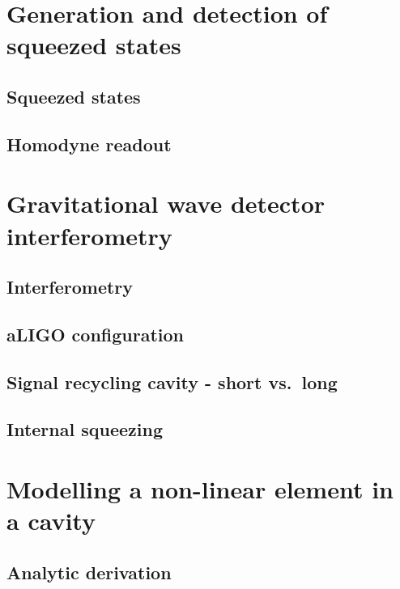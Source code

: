 \documentclass[aps,pra,superscriptaddress,reprint,nofootinbib]{revtex4-1}
\begin{document}
\section{Generation and detection of squeezed states}
\label{sec:squeezing}

\subsection{Squeezed states}


\subsection{Homodyne readout}



\section{Gravitational wave detector interferometry}
\label{sec:gwIFO}

\subsection{Interferometry}

\subsection{aLIGO configuration}

\subsection{Signal recycling cavity - short vs.\ long}

\subsection{Internal squeezing}



\section{Modelling a non-linear element in a cavity}
\label{sec:sqzcavity}

\subsection{Analytic derivation}
\end{document}
